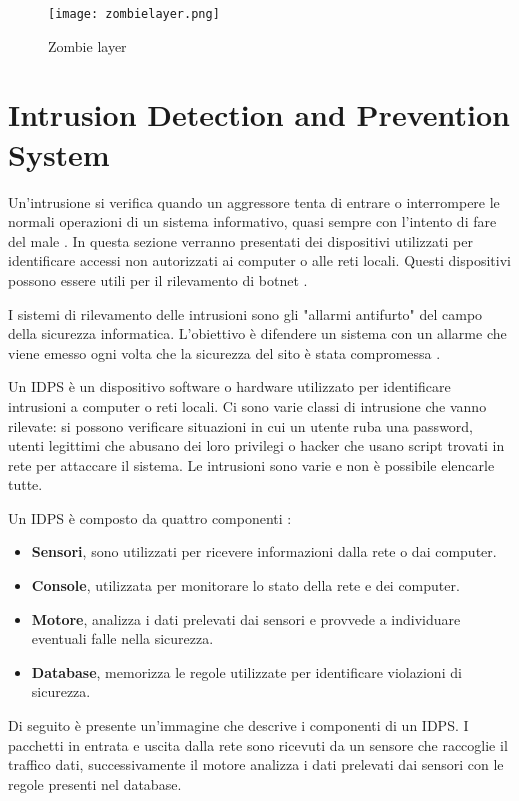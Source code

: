 \documentclass[../main.tex]{subfiles}
\begin{document}
\begin{figure}[H]
				\centering
				\texttt{[image: zombielayer.png]}
				\caption{Zombie layer}
\end{figure}

\section{Intrusion Detection and Prevention System}
Un'intrusione si verifica quando un aggressore tenta di entrare o interrompere le normali operazioni di un sistema informativo, quasi sempre con l'intento di fare del male \cite{idsbook}.
In questa sezione verranno presentati dei dispositivi utilizzati per identificare accessi non autorizzati ai computer o alle reti locali. Questi dispositivi possono essere utili per il rilevamento di botnet \cite{botnetdetection}.


I sistemi di rilevamento delle intrusioni sono gli "allarmi antifurto" del campo della sicurezza informatica. L'obiettivo è difendere un sistema con un allarme che viene emesso ogni volta che la sicurezza del sito è stata compromessa \cite{IDS}. 

Un IDPS è un dispositivo software o hardware utilizzato per identificare intrusioni a computer o reti locali.
Ci sono varie classi di intrusione che vanno rilevate: si possono verificare situazioni in cui un utente ruba una password, utenti legittimi che abusano dei loro privilegi o hacker che usano script trovati in rete per attaccare il sistema. Le intrusioni sono varie e non è possibile elencarle tutte.

Un IDPS è composto da quattro componenti \cite{idsbook}:

\begin{itemize}
				\item \textbf{Sensori}, sono utilizzati per ricevere informazioni dalla rete o dai computer.

				\item \textbf{Console}, utilizzata per monitorare lo stato della rete e dei computer.

				\item \textbf{Motore}, analizza i dati prelevati dai sensori e provvede a individuare eventuali falle nella sicurezza.

				\item \textbf{Database}, memorizza le regole utilizzate per identificare violazioni di sicurezza.
\end{itemize}

Di seguito è presente un'immagine che descrive i componenti di un IDPS. I pacchetti in entrata e uscita dalla rete sono ricevuti da un sensore che raccoglie il traffico dati, successivamente il motore analizza i dati prelevati dai sensori con le regole presenti nel database.
\end{document}
